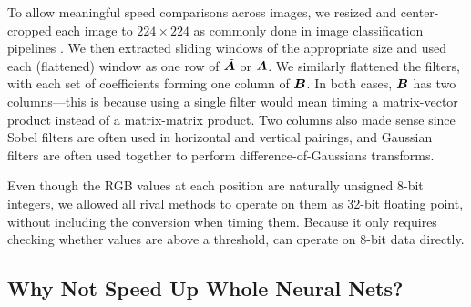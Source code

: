 To allow meaningful speed comparisons across images, we resized and center-cropped each image to $224 \times 224$ as commonly done in image classification pipelines \cite{resNet,resnet2,densenet}. We then extracted sliding windows of the appropriate size and used each (flattened) window as one row of $\tilde{\bm{A}}$ or $\bm{A}$. We similarly flattened the filters, with each set of coefficients forming one column of $\bm{B}$. In both cases, $\bm{B}$ has two columns---this is because using a single filter would mean timing a matrix-vector product instead of a matrix-matrix product. Two columns also made sense since Sobel filters are often used in horizontal and vertical pairings, and Gaussian filters are often used together to perform difference-of-Gaussians transforms.

Even though the RGB values at each position are naturally unsigned 8-bit integers, we allowed all rival methods to operate on them as 32-bit floating point, without including the conversion when timing them. Because it only requires checking whether values are above a threshold, \oursp can operate on 8-bit data directly.

\subsection{Why Not Speed Up Whole Neural Nets?}

